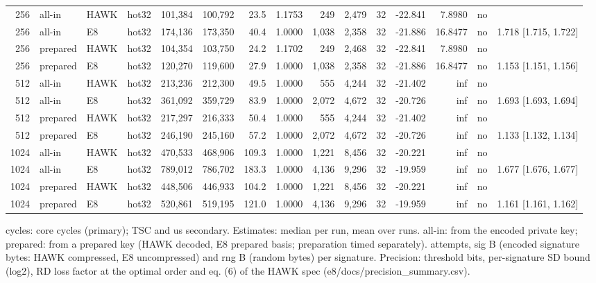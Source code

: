 \begin{table}[t]
{\begin{tabular}{rllcrrrrrrrrrcl}
256 & all-in & HAWK & hot32 & 101{,}384 & 100{,}792 & 23.5 & 1.1753 & 249 & 2{,}479 & 32 & -22.841 & 7.8980 & no &  \\
256 & all-in & E8 & hot32 & 174{,}136 & 173{,}350 & 40.4 & 1.0000 & 1{,}038 & 2{,}358 & 32 & -21.886 & 16.8477 & no & 1.718 [1.715, 1.722] \\
256 & prepared & HAWK & hot32 & 104{,}354 & 103{,}750 & 24.2 & 1.1702 & 249 & 2{,}468 & 32 & -22.841 & 7.8980 & no &  \\
256 & prepared & E8 & hot32 & 120{,}270 & 119{,}600 & 27.9 & 1.0000 & 1{,}038 & 2{,}358 & 32 & -21.886 & 16.8477 & no & 1.153 [1.151, 1.156] \\
512 & all-in & HAWK & hot32 & 213{,}236 & 212{,}300 & 49.5 & 1.0000 & 555 & 4{,}244 & 32 & -21.402 & inf & no &  \\
512 & all-in & E8 & hot32 & 361{,}092 & 359{,}729 & 83.9 & 1.0000 & 2{,}072 & 4{,}672 & 32 & -20.726 & inf & no & 1.693 [1.693, 1.694] \\
512 & prepared & HAWK & hot32 & 217{,}297 & 216{,}333 & 50.4 & 1.0000 & 555 & 4{,}244 & 32 & -21.402 & inf & no &  \\
512 & prepared & E8 & hot32 & 246{,}190 & 245{,}160 & 57.2 & 1.0000 & 2{,}072 & 4{,}672 & 32 & -20.726 & inf & no & 1.133 [1.132, 1.134] \\
1024 & all-in & HAWK & hot32 & 470{,}533 & 468{,}906 & 109.3 & 1.0000 & 1{,}221 & 8{,}456 & 32 & -20.221 & inf & no &  \\
1024 & all-in & E8 & hot32 & 789{,}012 & 786{,}702 & 183.3 & 1.0000 & 4{,}136 & 9{,}296 & 32 & -19.959 & inf & no & 1.677 [1.676, 1.677] \\
1024 & prepared & HAWK & hot32 & 448{,}506 & 446{,}933 & 104.2 & 1.0000 & 1{,}221 & 8{,}456 & 32 & -20.221 & inf & no &  \\
1024 & prepared & E8 & hot32 & 520{,}861 & 519{,}195 & 121.0 & 1.0000 & 4{,}136 & 9{,}296 & 32 & -19.959 & inf & no & 1.161 [1.161, 1.162] \\
\bottomrule
\end{tabular}}
\par\smallskip\parbox{\linewidth}{\scriptsize cycles: core cycles (primary); TSC and us secondary. Estimates: median per run, mean over runs. all-in: from the encoded private key; prepared: from a prepared key (HAWK decoded, E8 prepared basis; preparation timed separately). attempts, sig B (encoded signature bytes: HAWK compressed, E8 uncompressed) and rng B (random bytes) per signature. Precision: threshold bits, per-signature SD bound (log2), RD loss factor at the optimal order and eq. (6) of the HAWK spec (e8/docs/precision\_summary.csv).}
\end{table}

